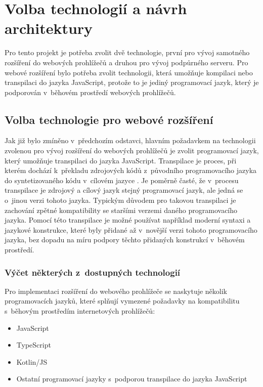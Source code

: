 \chapter{Volba technologií a návrh architektury}

Pro tento projekt je potřeba zvolit dvě technologie, první pro vývoj samotného rozšíření do webových prohlížečů a druhou pro vývoj podpůrného serveru. Pro webové rozšíření bylo potřeba zvolit technologii, která umožňuje kompilaci nebo transpilaci do jazyka JavaScript, protože to je jediný programovací jazyk, který je podporován v~běhovém prostředí webových prohlížečů.

\section{Volba technologie pro webové rozšíření}

Jak již bylo zmíněno v~předchozím odstavci, hlavním požadavkem na technologii zvolenou pro vývoj rozšíření do webových prohlížečů je zvolit programovací jazyk, který umožňuje transpilaci do jazyka JavaScript. Transpilace je proces, při kterém dochází k~překladu zdrojových kódů z~původního programovacího jazyka do syntetizovaného kódu v~cílovém jazyce \cite{fowler_transparent_2013}. Je poměrně časté, že v~procesu transpilace je zdrojový a cílový jazyk stejný programovací jazyk, ale jedná se o~jinou verzi tohoto jazyka. Typickým důvodem pro takovou transpilaci je zachování zpětné kompatibility se staršími verzemi daného programovacího jazyka. Pomocí této transpilace je možné používat například moderní syntaxi a jazykové konstrukce, které byly přidané až v~novější verzi tohoto programovacího jazyka, bez dopadu na míru podpory těchto přidaných konstrukcí v~běhovém prostředí.

\subsection{Výčet některých z~dostupných technologií}

Pro implementaci rozšíření do webového prohlížeče se naskytuje několik programovacích jazyků, které splňují vymezené požadavky na kompatibilitu s~běhovým prostředím internetových prohlížečů:

\begin{itemize}
    \item JavaScript
    \item TypeScript
    \item Kotlin/JS
    \item Ostatní programovací jazyky s~podporou transpilace do jazyka JavaScript
\end{itemize}

